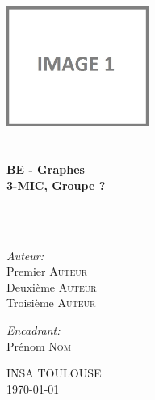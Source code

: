 \begin{titlepage}
\begin{center}

\includegraphics[width=0.35\textwidth]{./images/image1}~\\[2cm]


\textsc{\Large }\\[2.5cm]

\HRule \\[0.4cm]

{\huge \bfseries BE - Graphes\\
3-MIC, Groupe ? \\[0.4cm] }

\HRule \\[1.5cm]

\textsc{\Large }\\[1.5cm]


\begin{minipage}{0.4\textwidth}
\begin{flushleft} \large
\emph{Auteur:}\\
Premier \textsc{Auteur}\\
Deuxième \textsc{Auteur}\\
Troisième \textsc{Auteur}
\end{flushleft}
\end{minipage}
\begin{minipage}{0.4\textwidth}
\begin{flushright} \large
\emph{Encadrant:} \\
Prénom \textsc{Nom}
\end{flushright}
\end{minipage}

\vfill

\textsc{\LARGE INSA TOULOUSE}\\[1.5cm]

{\large \today}

\end{center}
\end{titlepage}
